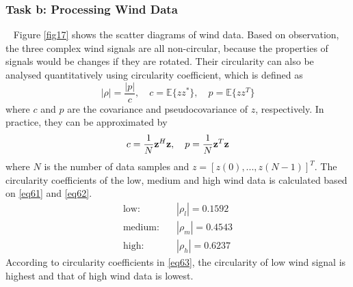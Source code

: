 \documentclass[10pt]{article}
\begin{document}
\subsubsection{Task b: Processing Wind Data}
\ \indent
Figure \ref{fig17} shows the scatter diagrams of wind data. Based on observation, the 
three complex wind signals are all non-circular, because the properties of 
signals would be changes if they are rotated. Their circularity can also be 
analysed quantitatively using circularity coefficient, which is defined as 
\begin{equation}
	|\rho| = \frac{|p|}{c}, \quad c = \mathbb{E}\{ z z^* \}, \quad p = \mathbb{E}\{ z z^T \} \label{eq61}
\end{equation}
where $c$ and $p$ are the covariance and pseudocovariance of $z$, respectively. In practice, 
they can be approximated by 
\begin{equation}
	c = \frac{1}{N} {\bf{z}}^H {\bf{z}}, \quad p = \frac{1}{N} {\bf{z}}^T {\bf{z}} \label{eq62}
\end{equation}
where $N$ is the number of data samples and $z = [z(0),...,z(N-1)]^T$. The circularity coefficients 
of the low, medium and high wind data is calculated based on \eqref{eq61} and \eqref{eq62}.
\begin{align}
	\text{low}:& \quad|\rho_l| = 0.1592 \nonumber\\
	\text{medium}:& \quad|\rho_m| = 0.4543 \label{eq63} \\ 
	\text{high}:& \quad|\rho_h| = 0.6237 \nonumber 
\end{align}
According to circularity coefficients in \eqref{eq63}, the circularity of low wind signal is highest and
that of high wind data is lowest.
\end{document}
